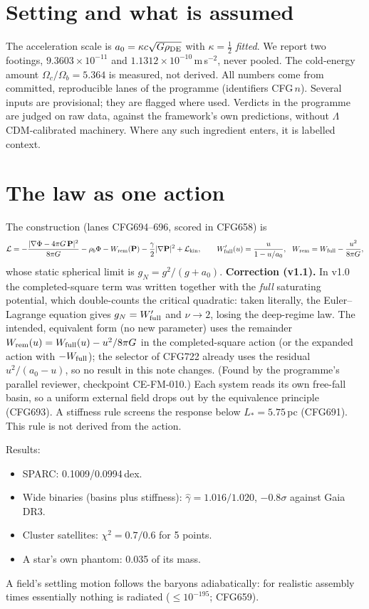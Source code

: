 \documentclass[10pt]{article}
\begin{document}
\section{Setting and what is assumed}
The acceleration scale is $a_0=\kappa c\sqrt{G\rho_{\rm DE}}$ with $\kappa=\tfrac12$ \emph{fitted}. We report two footings, $9.3603\times10^{-11}$ and $1.1312\times10^{-10}$\,m\,s$^{-2}$, never pooled. The cold-energy amount $\Omega_c/\Omega_b=5.364$ is measured, not derived. All numbers come from committed, reproducible lanes of the programme (identifiers CFG\,$n$). Several inputs are provisional; they are flagged where used. Verdicts in the programme are judged on raw data, against the framework's own predictions, without $\Lambda$CDM-calibrated machinery. Where any such ingredient enters, it is labelled context.

\section{The law as one action}
The construction (lanes CFG694--696, scored in CFG658) is
\begin{equation}
\mathcal L=-\frac{|\nabla\Phi-4\pi G\,\mathbf P|^2}{8\pi G}-\rho_b\Phi-W_{\rm rem}(\mathbf P)-\frac{\gamma}{2}|\nabla\mathbf P|^2+\mathcal L_{\rm kin},\qquad W_{\rm full}'(u)=\frac{u}{1-u/a_0},\ \ W_{\rm rem}=W_{\rm full}-\frac{u^2}{8\pi G},
\end{equation}
whose static spherical limit is $g_N=g^2/(g+a_0)$. \textbf{Correction (v1.1).} In v1.0 the completed-square term was written together with the \emph{full} saturating potential, which double-counts the critical quadratic: taken literally, the Euler--Lagrange equation gives $g_N=W'_{\rm full}$ and $\nu\to2$, losing the deep-regime law. The intended, equivalent form (no new parameter) uses the remainder $W_{\rm rem}(u)=W_{\rm full}(u)-u^2/8\pi G$ in the completed-square action (or the expanded action with $-W_{\rm full}$); the selector of CFG722 already uses the residual $u^2/(a_0-u)$, so no result in this note changes. (Found by the programme's parallel reviewer, checkpoint CE-FM-010.) Each system reads its own free-fall basin, so a uniform external field drops out by the equivalence principle (CFG693). A stiffness rule screens the response below $L_*=5.75$\,pc (CFG691). This rule is not derived from the action.

Results:
\begin{itemize}
\item SPARC: 0.1009/0.0994\,dex.
\item Wide binaries (basins plus stiffness): $\hat\gamma=1.016/1.020$, $-0.8\sigma$ against Gaia DR3.
\item Cluster satellites: $\chi^2=0.7/0.6$ for 5 points.
\item A star's own phantom: 0.035 of its mass.
\end{itemize}
A field's settling motion follows the baryons adiabatically: for realistic assembly times essentially nothing is radiated ($\le10^{-195}$; CFG659).
\end{document}
